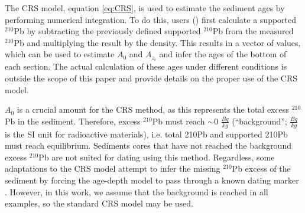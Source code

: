 \documentclass [10pt] {article}
\newcommand{\ac}{\color{red} }  %
\newcommand{\ca}{\color{black}} %
\begin{document}
The CRS model, equation \ref{eq:CRS}, is used to estimate the sediment ages by performing numerical integration. To do this, users () first calculate a supported $^{210}$Pb by subtracting the previously defined supported $^{210}$Pb from the measured $^{210}$Pb and multiplying the result by the density. This results in a vector of values, which can be used to estimate $A_0$ and $A_{z_i}$ and infer the ages of the bottom of each section. The actual calculation of these ages under different conditions is outside the scope of this paper and \citet{Sanchez-Cabeza2012} provide details on the proper use of the CRS model.


$A_0$ is a crucial amount for the CRS method, as this represents the total excess $^{210}$Pb in the sediment.
Therefore, excess $^{210}$Pb must reach $\sim$0 $\frac{Bq}{kg}$ (“background”; $\frac{Bq}{kg}$ is the SI unit for radioactive materials), i.e. total 210Pb and supported 210Pb must reach equilibrium. 
Sediments cores that have not reached the background excess $^{210}$Pb are not suited for dating using this method. Regardless, some adaptations to the CRS model attempt to infer the missing $^{210}$Pb excess of the sediment by forcing the age-depth model to pass through a known dating marker \citep[a depth where its age is known from other methods or with a constant sedimentation rate][]{Sanchez-Cabeza2012}. However, in this work, we assume that the background is reached in all examples, so the standard CRS model may be used.


\end{document}
